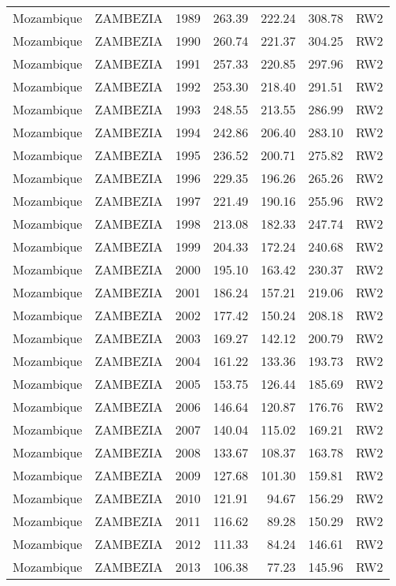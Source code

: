 \begin{longtable}{lllrrrl}
  Mozambique & ZAMBEZIA & 1989 & 263.39 & 222.24 & 308.78 & RW2 \\ 
  Mozambique & ZAMBEZIA & 1990 & 260.74 & 221.37 & 304.25 & RW2 \\ 
  Mozambique & ZAMBEZIA & 1991 & 257.33 & 220.85 & 297.96 & RW2 \\ 
  Mozambique & ZAMBEZIA & 1992 & 253.30 & 218.40 & 291.51 & RW2 \\ 
  Mozambique & ZAMBEZIA & 1993 & 248.55 & 213.55 & 286.99 & RW2 \\ 
  Mozambique & ZAMBEZIA & 1994 & 242.86 & 206.40 & 283.10 & RW2 \\ 
  Mozambique & ZAMBEZIA & 1995 & 236.52 & 200.71 & 275.82 & RW2 \\ 
  Mozambique & ZAMBEZIA & 1996 & 229.35 & 196.26 & 265.26 & RW2 \\ 
  Mozambique & ZAMBEZIA & 1997 & 221.49 & 190.16 & 255.96 & RW2 \\ 
  Mozambique & ZAMBEZIA & 1998 & 213.08 & 182.33 & 247.74 & RW2 \\ 
  Mozambique & ZAMBEZIA & 1999 & 204.33 & 172.24 & 240.68 & RW2 \\ 
  Mozambique & ZAMBEZIA & 2000 & 195.10 & 163.42 & 230.37 & RW2 \\ 
  Mozambique & ZAMBEZIA & 2001 & 186.24 & 157.21 & 219.06 & RW2 \\ 
  Mozambique & ZAMBEZIA & 2002 & 177.42 & 150.24 & 208.18 & RW2 \\ 
  Mozambique & ZAMBEZIA & 2003 & 169.27 & 142.12 & 200.79 & RW2 \\ 
  Mozambique & ZAMBEZIA & 2004 & 161.22 & 133.36 & 193.73 & RW2 \\ 
  Mozambique & ZAMBEZIA & 2005 & 153.75 & 126.44 & 185.69 & RW2 \\ 
  Mozambique & ZAMBEZIA & 2006 & 146.64 & 120.87 & 176.76 & RW2 \\ 
  Mozambique & ZAMBEZIA & 2007 & 140.04 & 115.02 & 169.21 & RW2 \\ 
  Mozambique & ZAMBEZIA & 2008 & 133.67 & 108.37 & 163.78 & RW2 \\ 
  Mozambique & ZAMBEZIA & 2009 & 127.68 & 101.30 & 159.81 & RW2 \\ 
  Mozambique & ZAMBEZIA & 2010 & 121.91 & 94.67 & 156.29 & RW2 \\ 
  Mozambique & ZAMBEZIA & 2011 & 116.62 & 89.28 & 150.29 & RW2 \\ 
  Mozambique & ZAMBEZIA & 2012 & 111.33 & 84.24 & 146.61 & RW2 \\ 
  Mozambique & ZAMBEZIA & 2013 & 106.38 & 77.23 & 145.96 & RW2 \\ 

\end{longtable}
